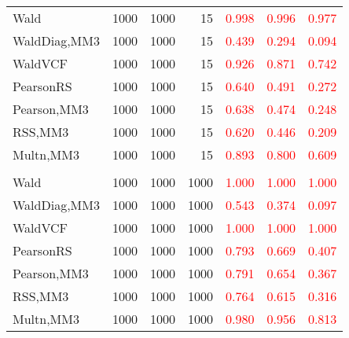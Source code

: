 \documentclass[
]{article}
\begin{document}
\begin{table}[H]
{\begin{tabular}[t]{lrrrrrr}
\hspace{1em}Wald & 1000 & 1000 & 15 & \textcolor{red}{0.998} & \textcolor{red}{0.996} & \textcolor{red}{0.977}\\
\hspace{1em}WaldDiag,MM3 & 1000 & 1000 & 15 & \textcolor{red}{0.439} & \textcolor{red}{0.294} & \textcolor{red}{0.094}\\
\hspace{1em}WaldVCF & 1000 & 1000 & 15 & \textcolor{red}{0.926} & \textcolor{red}{0.871} & \textcolor{red}{0.742}\\
\hspace{1em}PearsonRS & 1000 & 1000 & 15 & \textcolor{red}{0.640} & \textcolor{red}{0.491} & \textcolor{red}{0.272}\\
\hspace{1em}Pearson,MM3 & 1000 & 1000 & 15 & \textcolor{red}{0.638} & \textcolor{red}{0.474} & \textcolor{red}{0.248}\\
\hspace{1em}RSS,MM3 & 1000 & 1000 & 15 & \textcolor{red}{0.620} & \textcolor{red}{0.446} & \textcolor{red}{0.209}\\
\hspace{1em}Multn,MM3 & 1000 & 1000 & 15 & \textcolor{red}{0.893} & \textcolor{red}{0.800} & \textcolor{red}{0.609}\\
\addlinespace[0.3em]
\multicolumn{7}{l}{\textbf{3F 15V}}\\
\hspace{1em}Wald & 1000 & 1000 & 1000 & \textcolor{red}{1.000} & \textcolor{red}{1.000} & \textcolor{red}{1.000}\\
\hspace{1em}WaldDiag,MM3 & 1000 & 1000 & 1000 & \textcolor{red}{0.543} & \textcolor{red}{0.374} & \textcolor{red}{0.097}\\
\hspace{1em}WaldVCF & 1000 & 1000 & 1000 & \textcolor{red}{1.000} & \textcolor{red}{1.000} & \textcolor{red}{1.000}\\
\hspace{1em}PearsonRS & 1000 & 1000 & 1000 & \textcolor{red}{0.793} & \textcolor{red}{0.669} & \textcolor{red}{0.407}\\
\hspace{1em}Pearson,MM3 & 1000 & 1000 & 1000 & \textcolor{red}{0.791} & \textcolor{red}{0.654} & \textcolor{red}{0.367}\\
\hspace{1em}RSS,MM3 & 1000 & 1000 & 1000 & \textcolor{red}{0.764} & \textcolor{red}{0.615} & \textcolor{red}{0.316}\\
\hspace{1em}Multn,MM3 & 1000 & 1000 & 1000 & \textcolor{red}{0.980} & \textcolor{red}{0.956} & \textcolor{red}{0.813}\\
\bottomrule
\end{tabular}}
\endgroup{}
\end{table}
\end{document}

